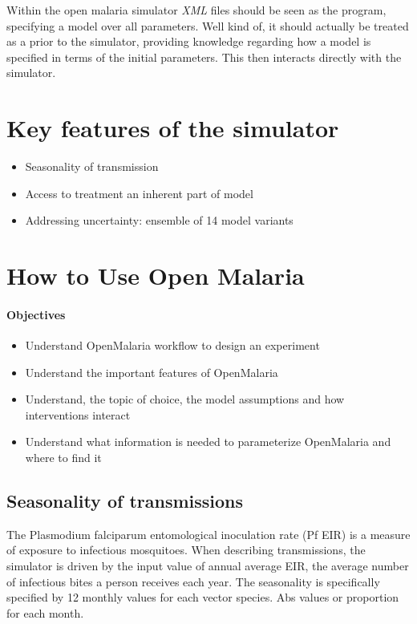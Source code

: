 \documentclass[]{scrartcl}
\begin{document}
Within the open malaria simulator \textit{XML} files should be seen as the program, specifying a model over all parameters. Well kind of, it should actually be treated as a prior to the simulator, providing knowledge regarding how a model is specified in terms of the initial parameters. This then interacts directly with the simulator. 


\section{Key features of the simulator}

\begin{itemize}
\item Seasonality of transmission
\item Access to treatment an inherent part of model
\item Addressing uncertainty: ensemble of 14 model variants

\end{itemize}
\section{How to Use Open Malaria}

\paragraph*{Objectives}
\begin{itemize}
	\item Understand OpenMalaria workflow to design an experiment
	\item Understand the important features of OpenMalaria
	\item Understand, the topic of choice, the model assumptions and how interventions interact 
	\item Understand what information is needed to parameterize OpenMalaria and where to find it
\end{itemize}


\subsection{Seasonality of transmissions}
The Plasmodium falciparum entomological inoculation rate (Pf EIR) is a measure of exposure to infectious mosquitoes. 
When describing transmissions, the simulator is driven by the input value of annual average EIR, the average number of infectious bites a person receives each year.
The seasonality is specifically specified by 12 monthly values for each vector species. Abs values or proportion for each month.
\end{document}
